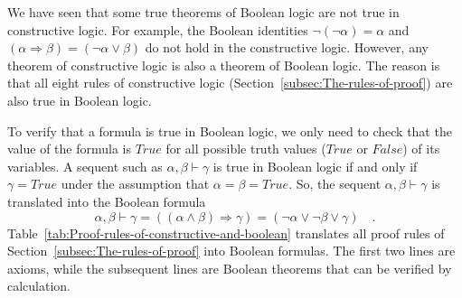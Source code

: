 We have seen that some true theorems of Boolean logic are not true
in constructive logic. For example, the Boolean identities $\neg\left(\neg\alpha\right)=\alpha$
and $\left(\alpha\Rightarrow\beta\right)=(\neg\alpha\vee\beta)$ do
not hold in the constructive logic. However, any theorem of constructive
logic is also a theorem of Boolean logic. The reason is that all eight
rules of constructive logic (Section~\ref{subsec:The-rules-of-proof})
are also true in Boolean logic.

To verify that a formula is true in Boolean logic, we only need to
check that the value of the formula is $True$ for all possible truth
values ($True$ or $False$) of its variables. A sequent such as $\alpha,\beta\vdash\gamma$
is true in Boolean logic if and only if $\gamma=True$ under the assumption
that $\alpha=\beta=True$. So, the sequent $\alpha,\beta\vdash\gamma$
is translated into the Boolean formula 
\[
\alpha,\beta\vdash\gamma=\left(\left(\alpha\wedge\beta\right)\Rightarrow\gamma\right)=\left(\neg\alpha\vee\neg\beta\vee\gamma\right)\quad.
\]
Table~\ref{tab:Proof-rules-of-constructive-and-boolean} translates
all proof rules of Section~\ref{subsec:The-rules-of-proof} into
Boolean formulas. The first two lines are axioms, while the subsequent
lines are Boolean theorems that can be verified by calculation.

